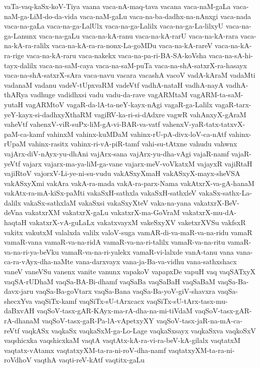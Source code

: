 {vaTa-vaq-kaSx-koV-Tiya
vaana
vaca-nA-maq-tava
vacana
vaca-naM-gaLa
vaca-naM-ga-LiM-do-da-vida
vaca-naM-gaLu
vaca-na-ba-dadhx-na-nAnxgi
vaca-nada
vaca-na-gaLa
vaca-na-ga-LalUlx
vaca-na-ga-Lalilx
vaca-na-ga-La-lilxyU
vaca-na-ga-Lanunx
vaca-na-gaLu
vaca-na-kA-ranu
vaca-na-kA-rarU
vaca-na-kA-rara
vaca-na-kA-ra-ralilx
vaca-na-kA-ra-ra-nonx-La-goMDu
vaca-na-kA-rareV
vaca-na-kA-ra-rige
vaca-na-kA-raru
vaca-nakekx
vaca-na-pa-ri-BA-SA-koVsha
vaca-na-sA-hi-tayx-dalilx
vaca-na-saM-caya
vaca-na-saM-puTa
vaca-na-shA-satxrX-ra-hasayx
vaca-na-shA-satxrX-sAra
vaca-navu
vacara
vacashA
vacoV
vadA-kAraM
vadaMti
vadanaM
vadanu
vadeV-tUpxvaRM
vadeVtf
vadhA-nataH
vadhA-nayA
vadhA-thARya
vadhuge
vadidhxsi
vadu
vadu-da-rave
vagARMtaM
vagARM-ta-saM-yutaH
vagARMtoV
vagaR-da-lA-ta-neY-kayx-nAgi
vagaR-ga-Lalilx
vagaR-tarx-yeY-kayx-si-dadhxyXthaRM
vagiRV-ka-ri-si-dAdxre
vagwR
vahAnxyX-gAraM
vaheVtf
vahenxV-viR-suPx-liM-gA-vi-BAR-va-vatf
vahenxV-yaR-tatx-tatxvX-paM-ca-kamf
vahinxM
vahinx-kuMDaM
vahinx-rU-pA-divx-loV-ca-nAtf
vahinx-rUpaM
vahinx-rasitx
vahinx-ri-vA-piR-tamf
vahi-su-tAtxne
vahudu
vahwnx
vajArx-diV-nAyx-yu-dhAni
vajArx-sana
vajArx-yu-dha-vAgi
vajaR-namf
vajaR-yeVtf
vajarx
vajarx-ma-ya-liM-ga-vane
vajarx-meV-voVkatxM
vajayxR
vajiRtaH
vajiRtoV
vajorxV-Li-ye-ni-su-vudu
vakASxyXmaH
vakASxyX-mayx-sheVSA
vakASxyXmi
vakAra
vakA-ra-mada
vakA-ra-parx-Nama
vakAtxrX-va-gA-hanaM
vakAtx-ra-mA-kiSx-paMti
vakaSxH-sathxla
vakaSxH-sathxleV
vakaSx-sathx-La-dalilx
vakaSx-sathxlaM
vakaSxsi
vakaSxyXteV
vaka-na-yana
vakatxrX-BeV-deVna
vakatxrXM
vakatxrX-gaLu
vakatxrX-ma-GoVraM
vakatxrX-mu-dA-haqtaH
vakatxrX-vA-guLaLx
vakatxvayxM
vakeSxyXV
vaketxrXVSu
vakfsxR
vakitx
vakutxM
valalxda
valilx
valoV-suga
vamAR-di-va-maR-va-na-ridu
vamaR
vamaR-vana
vamaR-va-na-ridA
vamaR-va-na-ri-talilx
vamaR-va-na-ritu
vamaR-va-na-ri-ya-beVku
vamaR-va-na-ri-yalekx
vamaR-vi-lalxde
vanA-tanu
vana
vana-ca-ra-vAyx-dha-naMte
vana-darxvayx
vana-ja-Ba-va-vidhu
vana-sathxshacx
vaneV
vaneVSu
vanenx
vanite
vanunx
vapakoV
vapapxDe
vapuH
vaq
vaqSATxyX
vaqSA-rUDhaM
vaqSa-BA-Bi-dhamf
vaqSaBa
vaqSaBaH
vaqSaBaM
vaqSa-Ba-davx-jaru
vaqSa-Ba-goVtarx
vaqSa-Bana
vaqSa-Ba-yoV-giV-shavxra
vaqSa-shecxYva
vaqSiTx-kamf
vaqSiTx-sU-tArxcacx
vaqSiTx-sU-tArx-tasx-mu-daBxvAH
vaqSoV-tasx-gAR-KAyx-ma-rA-dha-na-mi-tiVdaM
vaqSoV-tasx-gAR-rA-dhanaM
vaqSoV-tasx-gaR-Pa-lA-vApetxyXY
vaqSoV-tasx-jaR-na-mA-ca-reVtf
vaqkASx
vaqkaSx
vaqkaSxM-ga-Lo-Lage
vaqkaSxsayx
vaqkaSxva
vaqkoSxV
vaqshicxka
vaqshicxkaM
vaqtA
vaqtAtx-kA-ra-vi-ra-beV-kA-gilalx
vaqtatxM
vaqtatx-vAtamx
vaqtatxyXM-ta-ra-ni-roV-dha-namf
vaqtatxyXM-ta-ra-ni-roVdhoV
vaqthA
vaqti-reV-kAtf
vaqtitx-gaLu
}
